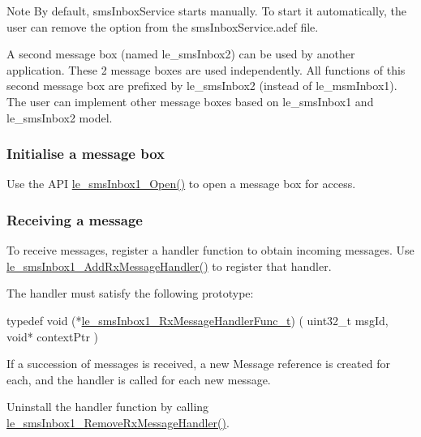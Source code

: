 \begin{DoxyNote}{Note}
By default, sms\+Inbox\+Service starts manually. To start it automatically, the user can remove the option from the sms\+Inbox\+Service.\+adef file.
\end{DoxyNote}
A second message box (named le\+\_\+sms\+Inbox2) can be used by another application. These 2 message boxes are used independently. All functions of this second message box are prefixed by le\+\_\+sms\+Inbox2 (instead of le\+\_\+msm\+Inbox1). The user can implement other message boxes based on le\+\_\+sms\+Inbox1 and le\+\_\+sms\+Inbox2 model.\hypertarget{c_sms_inbox_le_smsInbox_init}{}\subsubsection{Initialise a message box}\label{c_sms_inbox_le_smsInbox_init}
Use the A\+P\+I \hyperlink{le__sms_inbox1__interface_8h_ab5c07622b824f8af32de8a7c6f6aaf53}{le\+\_\+sms\+Inbox1\+\_\+\+Open()} to open a message box for access.\hypertarget{c_sms_inbox_le_smsInbox_receiving}{}\subsubsection{Receiving a message}\label{c_sms_inbox_le_smsInbox_receiving}
To receive messages, register a handler function to obtain incoming messages. Use \hyperlink{le__sms_inbox1__interface_8h_ad1921790ff294865477be5508fc46f87}{le\+\_\+sms\+Inbox1\+\_\+\+Add\+Rx\+Message\+Handler()} to register that handler.

The handler must satisfy the following prototype\+: 
\begin{DoxyCode}
\textcolor{keyword}{typedef} void (*\hyperlink{le__sms_inbox1__interface_8h_a19b58278c1549e54f5af6ff2542c3458}{le\_smsInbox1\_RxMessageHandlerFunc\_t})
(
  uint32\_t msgId,
  \textcolor{keywordtype}{void}*    contextPtr
)
\end{DoxyCode}


If a succession of messages is received, a new Message reference is created for each, and the handler is called for each new message.

Uninstall the handler function by calling \hyperlink{le__sms_inbox1__interface_8h_a58587948e7bf5612bcb38164edfa4fee}{le\+\_\+sms\+Inbox1\+\_\+\+Remove\+Rx\+Message\+Handler()}.

